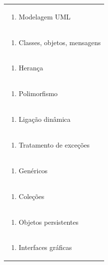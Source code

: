 \documentclass[11pt]{article}
\begin{document}
\begin{center}
\begin{longtable}{|p{4cm}|p{4cm}|p{4cm}|p{4cm}|}
\multicolumn{4}{|p{\dimexpr 16cm + 6\tabcolsep\relax}|}{\begin{enumerate}[start=2]\item Modelagem UML\end{enumerate}}\\
\multicolumn{4}{|p{\dimexpr 16cm + 6\tabcolsep\relax}|}{\begin{enumerate}[start=3]\item Classes, objetos, mensagens\end{enumerate}}\\
\multicolumn{4}{|p{\dimexpr 16cm + 6\tabcolsep\relax}|}{\begin{enumerate}[start=4]\item Herança\end{enumerate}}\\
\multicolumn{4}{|p{\dimexpr 16cm + 6\tabcolsep\relax}|}{\begin{enumerate}[start=5]\item Polimorfismo\end{enumerate}}\\
\multicolumn{4}{|p{\dimexpr 16cm + 6\tabcolsep\relax}|}{\begin{enumerate}[start=6]\item Ligação dinâmica\end{enumerate}}\\
\multicolumn{4}{|p{\dimexpr 16cm + 6\tabcolsep\relax}|}{\begin{enumerate}[start=7]\item Tratamento de exceções\end{enumerate}}\\
\multicolumn{4}{|p{\dimexpr 16cm + 6\tabcolsep\relax}|}{\begin{enumerate}[start=8]\item Genéricos\end{enumerate}}\\
\multicolumn{4}{|p{\dimexpr 16cm + 6\tabcolsep\relax}|}{\begin{enumerate}[start=9]\item Coleções\end{enumerate}}\\
\multicolumn{4}{|p{\dimexpr 16cm + 6\tabcolsep\relax}|}{\begin{enumerate}[start=10]\item Objetos persistentes\end{enumerate}}\\
\multicolumn{4}{|p{\dimexpr 16cm + 6\tabcolsep\relax}|}{\begin{enumerate}[start=11]\item Interfaces gráficas\end{enumerate}}\\

\end{longtable}
\end{center}
\end{document}

